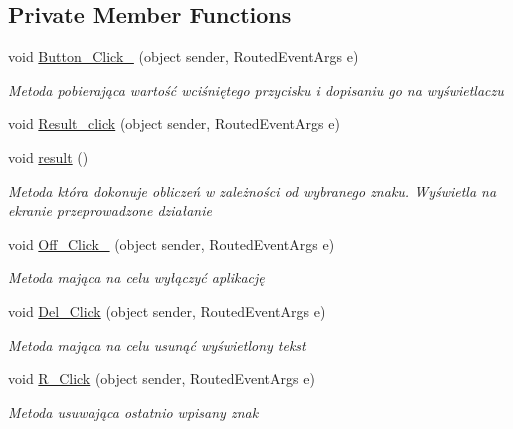 \subsection*{Private Member Functions}
\begin{DoxyCompactItemize}
\item 
void \mbox{\hyperlink{class_my_calculatorv1_1_1_main_window_aeb46937c128a2025721bf75e21c45d3b}{Button\+\_\+\+Click\+\_}} (object sender, Routed\+Event\+Args e)
\begin{DoxyCompactList}\small\item\em Metoda pobierająca wartość wciśniętego przycisku i dopisaniu go na wyświetlaczu \end{DoxyCompactList}\item 
void \mbox{\hyperlink{class_my_calculatorv1_1_1_main_window_a6c07df3d7d2ac3eb3218f01a2f3de9c6}{Result\+\_\+click}} (object sender, Routed\+Event\+Args e)
\item 
void \mbox{\hyperlink{class_my_calculatorv1_1_1_main_window_ad2ba19ce602b4bd65b01bc3c2e44d853}{result}} ()
\begin{DoxyCompactList}\small\item\em Metoda która dokonuje obliczeń w zależności od wybranego znaku. Wyświetla na ekranie przeprowadzone działanie \end{DoxyCompactList}\item 
void \mbox{\hyperlink{class_my_calculatorv1_1_1_main_window_a21ab4fba529eb56956dd8fe73bb7221a}{Off\+\_\+\+Click\+\_}} (object sender, Routed\+Event\+Args e)
\begin{DoxyCompactList}\small\item\em Metoda mająca na celu wyłączyć aplikację \end{DoxyCompactList}\item 
void \mbox{\hyperlink{class_my_calculatorv1_1_1_main_window_a16fceaf60e1a42e3377c49b7266e339b}{Del\+\_\+\+Click}} (object sender, Routed\+Event\+Args e)
\begin{DoxyCompactList}\small\item\em Metoda mająca na celu usunąć wyświetlony tekst \end{DoxyCompactList}\item 
void \mbox{\hyperlink{class_my_calculatorv1_1_1_main_window_a16f87a39b16c90c644dc32632f73a86c}{R\+\_\+\+Click}} (object sender, Routed\+Event\+Args e)
\begin{DoxyCompactList}\small\item\em Metoda usuwająca ostatnio wpisany znak \end{DoxyCompactList}\end{DoxyCompactItemize}


